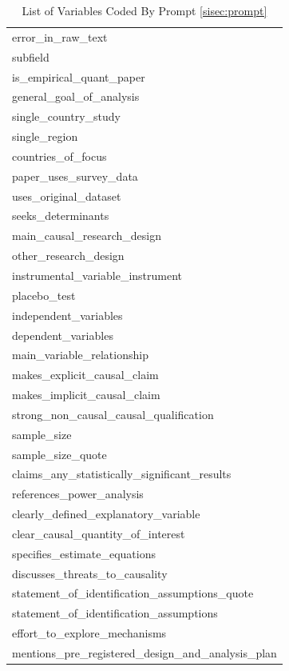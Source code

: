\documentclass[12pt]{article}
\begin{document}
\begin{table}[!ht]
\centering
\caption{List of Variables Coded By Prompt \ref{sisec:prompt}}
\label{tab:prompt_variables}
\begin{tabular}{l}
\hline\hline\scriptsize
error\_in\_raw\_text \\
subfield \\
is\_empirical\_quant\_paper \\
general\_goal\_of\_analysis \\
single\_country\_study \\
single\_region \\
countries\_of\_focus \\
paper\_uses\_survey\_data \\
uses\_original\_dataset \\
seeks\_determinants \\
main\_causal\_research\_design \\
other\_research\_design \\
instrumental\_variable\_instrument \\
placebo\_test \\
independent\_variables \\
dependent\_variables \\
main\_variable\_relationship \\
makes\_explicit\_causal\_claim \\
makes\_implicit\_causal\_claim \\
strong\_non\_causal\_causal\_qualification \\
sample\_size \\
sample\_size\_quote \\
claims\_any\_statistically\_significant\_results \\
references\_power\_analysis \\
clearly\_defined\_explanatory\_variable \\
clear\_causal\_quantity\_of\_interest \\
specifies\_estimate\_equations \\
discusses\_threats\_to\_causality \\
statement\_of\_identification\_assumptions\_quote \\
statement\_of\_identification\_assumptions \\
effort\_to\_explore\_mechanisms \\
mentions\_pre\_registered\_design\_and\_analysis\_plan \\
\hline
\end{tabular}
\end{table}
\FloatBarrier
\clearpage
\end{document}
